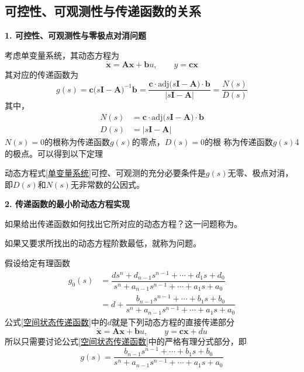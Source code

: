 \subsection{可控性、可观测性与传递函数的关系}
\noindent \textbf{1. 可控性、可观测性与零极点对消问题}

考虑单变量系统，其动态方程为
\begin{equation}
	\dot{\bm{x}} = \bm{Ax} + \bm{b}u,\qquad 
	y = \bm{cx}
	\label{单变量系统}
\end{equation}
其对应的传递函数为
\begin{equation}
	g(s) = \bm{c}\big(s\bm{I} - \bm{A}\big)^{-1}\bm{b} = \dfrac{\bm{c}\cdot \text{adj}\big(s\bm{I} - \bm{A}\big)\cdot \bm{b}}{\big|s\bm{I} - \bm{A}\big|} = \dfrac{N(s)}{D(s)}
\end{equation}
其中，
\begin{align*}
	N(s) &= \bm{c} \cdot \text{adj}\big(s\bm{I} - \bm{A}\big)\cdot \bm{b}\\
	D(s) &= \big|s \bm{I} - \bm{A}\big|
\end{align*}
$N(s) = 0$的根称为传递函数$g(s)$的零点，$D(s)=0$的根
称为传递函数$g(s)$4的极点。可以得到以下定理

动态方程式\eqref{单变量系统}可控、可观测的充分必要条件是$g(s)$无零、极点对消，即$D(s)$和$N(s)$无非常数的公因式。
\vspace*{1em}

\noindent \textbf{2. 传递函数的最小阶动态方程实现}

如果给出传递函数如何找出它所对应的动态方程？这一问题称为。

如果又要求所找出的动态方程阶数最低，就称为问题。

假设给定有理函数
\begin{equation}
	\begin{aligned}
		g_0(s) & = \dfrac{ds^n + d_{n-1}s^{n-1} + \cdots + d_1s + d_0}{s^n + a_{n-1}s^{n-1} + \cdots +a_1s + a_0}\\[0.5em]
		& = d + \dfrac{b_{n-1}s^{n-1} + \cdots +b_1s + b_0}{s^{n} + a_{n-1}s^{n-1} + \cdots + a_1s + a_0}
	\end{aligned}
	\label{空间状态传递函数}
\end{equation}
公式\eqref{空间状态传递函数}中的$d$就是下列动态方程的直接传递部分
\begin{equation}
	\dot{\bm{x}} = \bm{Ax} + \bm{b}u, \qquad y = \bm{cx} + du
\end{equation}
所以只需要讨论公式\eqref{空间状态传递函数}中的严格有理分式部分，即
\begin{equation}
	g(s) = \dfrac{b_{n-1}s^{n-1} + \cdots +b_1s + b_0}{s^{n} + a_{n-1}s^{n-1} + \cdots + a_1s + a_0}
	\label{严格有理分式}
\end{equation}

